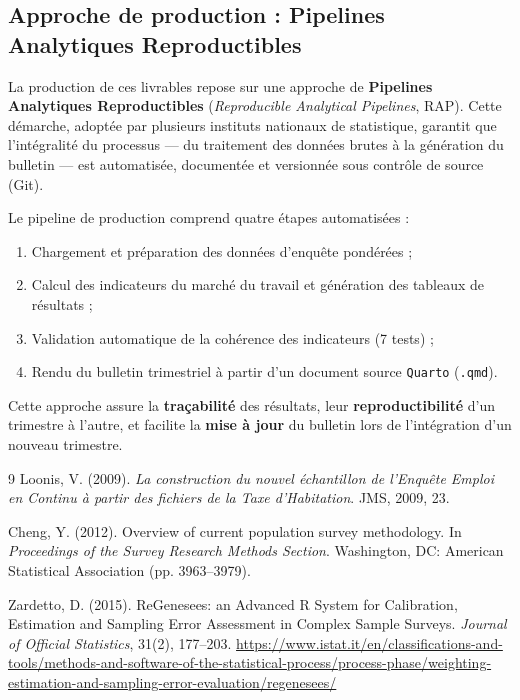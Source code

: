\documentclass[12pt, a4paper]{article}
\begin{document}
\subsection{Approche de production : Pipelines Analytiques Reproductibles}

La production de ces livrables repose sur une approche de \textbf{Pipelines Analytiques Reproductibles} (\textit{Reproducible Analytical Pipelines}, RAP). Cette démarche, adoptée par plusieurs instituts nationaux de statistique, garantit que l'intégralité du processus — du traitement des données brutes à la génération du bulletin — est automatisée, documentée et versionnée sous contrôle de source (Git).

Le pipeline de production comprend quatre étapes automatisées :
\begin{enumerate}[label=(\roman*), noitemsep]
  \item Chargement et préparation des données d'enquête pondérées ;
  \item Calcul des indicateurs du marché du travail et génération des tableaux de résultats ;
  \item Validation automatique de la cohérence des indicateurs (7 tests) ;
  \item Rendu du bulletin trimestriel à partir d'un document source \texttt{Quarto} (\texttt{.qmd}).
\end{enumerate}

Cette approche assure la \textbf{traçabilité} des résultats, leur \textbf{reproductibilité} d'un trimestre à l'autre, et facilite la \textbf{mise à jour} du bulletin lors de l'intégration d'un nouveau trimestre.

\newpage
\begin{thebibliography}{9}
Loonis, V. (2009).
\textit{La construction du nouvel échantillon de l'Enquête Emploi en Continu à partir des fichiers de la Taxe d'Habitation}.
JMS, 2009, 23.

Cheng, Y. (2012).
Overview of current population survey methodology.
In \textit{Proceedings of the Survey Research Methods Section}.
Washington, DC: American Statistical Association (pp. 3963--3979).

Zardetto, D. (2015).
ReGenesees: an Advanced R System for Calibration, Estimation and Sampling Error Assessment in Complex Sample Surveys.
\textit{Journal of Official Statistics}, 31(2), 177--203.
\url{https://www.istat.it/en/classifications-and-tools/methods-and-software-of-the-statistical-process/process-phase/weighting-estimation-and-sampling-error-evaluation/regenesees/}
\end{thebibliography}
\end{document}
